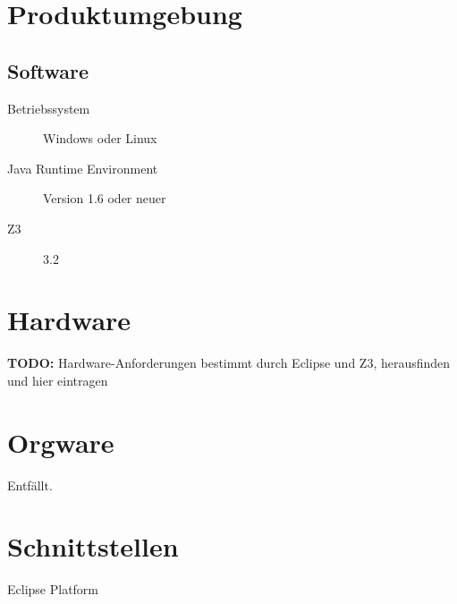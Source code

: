 \section{Produktumgebung}%

\subsection{Software}%

\begin{description}%
    \item [Betriebssystem] \siehe Windows oder \siehe Linux%
    \item [\siehe Java Runtime Environment] Version 1.6 oder neuer%
    \item [\siehe Z3] 3.2%
\end{description}%

\section{Hardware}%

\textbf{TODO:} Hardware-Anforderungen bestimmt durch Eclipse und Z3, herausfinden und hier eintragen%

\section{\siehe Orgware}%

Entfällt.%

\section{Schnittstellen}%

\begin{description}%
    \item [\siehe Eclipse Platform]%
\end{description}%
